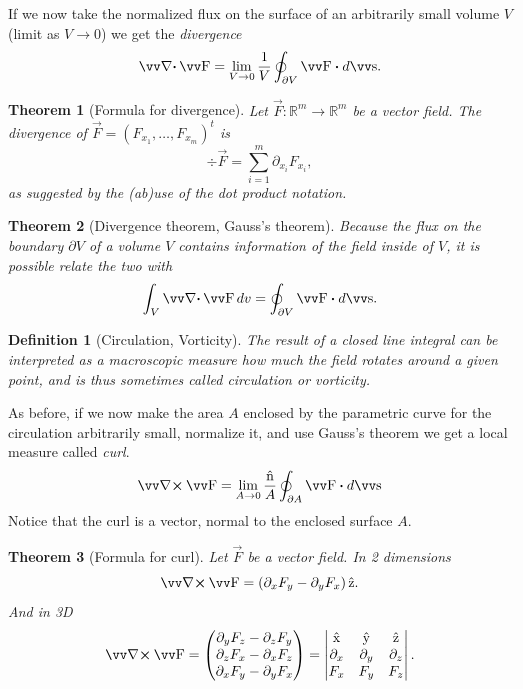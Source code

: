 \documentclass[twocolumn, margin=small]{tex/hsrzf}
\theoremstyle{fuvarzf}
\newtheorem{theorem}{Theorem}
\newtheorem{definition}{Definition}
\begin{document}
If we now take the normalized flux on the surface of an arbitrarily small
volume \(V\) (limit as \(V\to 0\)) we get the \emph{divergence}
\[
  \div \vec{F} = \lim_{V\to 0} \frac{1}{V} \oint_{\partial V} \vec{F}\dotp d\vec{s} .
\]

\begin{theorem}[Formula for divergence]
  Let \(\vec{F}: \mathbb{R}^m \to \mathbb{R}^m\) be a vector field.
  The divergence of \(\vec{F} = (F_{x_1},\ldots, F_{x_m})^t\) is
  \[
    \div\vec{F} = \sum_{i = 1}^m \partial_{x_i} F_{x_i} ,
  \]
  as suggested by the (ab)use of the dot product notation.
\end{theorem}

\begin{theorem}[Divergence theorem, Gauss's theorem]
  Because the flux on the boundary \(\partial V\) of a volume \(V\) contains
  information of the field inside of \(V\), it is possible relate the two with
  \[
    \int_V \div \vec{F} \,dv = \oint_{\partial V} \vec{F} \dotp d\vec{s} .
  \]
\end{theorem}

\begin{definition}[Circulation, Vorticity]
  The result of a closed line integral can be interpreted as a macroscopic
  measure how much the field rotates around a given point, and is thus
  sometimes called \emph{circulation} or \emph{vorticity}.
\end{definition}

As before, if we now make the area \(A\) enclosed by the parametric curve for
the circulation arbitrarily small, normalize it, and use Gauss's theorem we get
a local measure called \emph{curl}.
\[
  \curl \vec{F} =
  \lim_{A\to 0} \frac{\uvec{n}}{A} \oint_{\partial A} \vec{F} \dotp d\vec{s}
\]
Notice that the curl is a vector, normal to the enclosed surface \(A\).

\begin{theorem}[Formula for curl]
  Let \(\vec{F}\) be a vector field. In 2 dimensions
  \[
    \curl \vec{F} = \left(\partial_x F_y - \partial_y F_x\right)\uvec{z}.
  \]
  And in 3D
  \[
    \curl \vec{F} = \begin{pmatrix}
      \partial_y F_z - \partial_z F_y \\
      \partial_z F_x - \partial_x F_z \\
      \partial_x F_y - \partial_y F_x
    \end{pmatrix}
    = \begin{vmatrix}
      \uvec{x} & \uvec{y} & \uvec{z} \\
      \partial_x & \partial_y & \partial_z \\
      F_x & F_y & F_z
    \end{vmatrix} .
  \]
\end{theorem}
\end{document}
